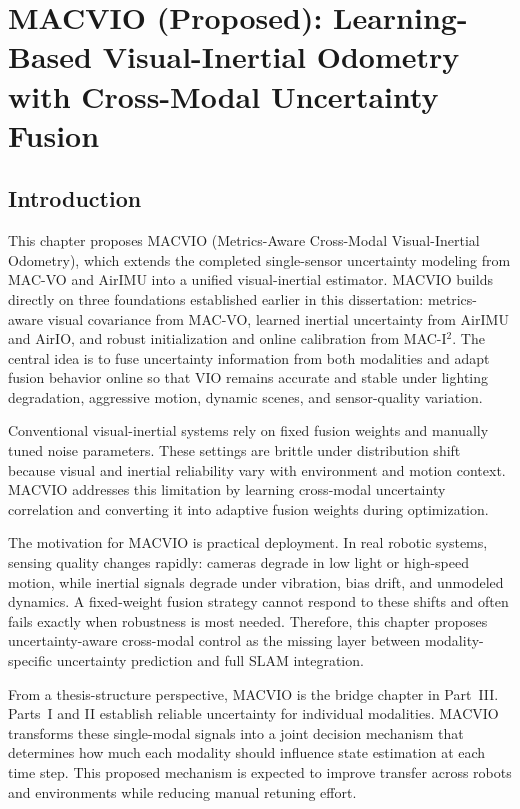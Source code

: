 \chapter{MACVIO (Proposed): Learning-Based Visual-Inertial Odometry with Cross-Modal Uncertainty Fusion} \label{chapter:macvio}

\section{Introduction}

This chapter proposes MACVIO (Metrics-Aware Cross-Modal Visual-Inertial Odometry), which extends the completed single-sensor uncertainty modeling from MAC-VO and AirIMU into a unified visual-inertial estimator.
MACVIO builds directly on three foundations established earlier in this dissertation: metrics-aware visual covariance from MAC-VO, learned inertial uncertainty from AirIMU and AirIO, and robust initialization and online calibration from MAC-I$^2$.
The central idea is to fuse uncertainty information from both modalities and adapt fusion behavior online so that VIO remains accurate and stable under lighting degradation, aggressive motion, dynamic scenes, and sensor-quality variation.

Conventional visual-inertial systems rely on fixed fusion weights and manually tuned noise parameters.
These settings are brittle under distribution shift because visual and inertial reliability vary with environment and motion context.
MACVIO addresses this limitation by learning cross-modal uncertainty correlation and converting it into adaptive fusion weights during optimization.

The motivation for MACVIO is practical deployment.
In real robotic systems, sensing quality changes rapidly: cameras degrade in low light or high-speed motion, while inertial signals degrade under vibration, bias drift, and unmodeled dynamics.
A fixed-weight fusion strategy cannot respond to these shifts and often fails exactly when robustness is most needed.
Therefore, this chapter proposes uncertainty-aware cross-modal control as the missing layer between modality-specific uncertainty prediction and full SLAM integration.

From a thesis-structure perspective, MACVIO is the bridge chapter in Part~III.
Parts~I and II establish reliable uncertainty for individual modalities.
MACVIO transforms these single-modal signals into a joint decision mechanism that determines how much each modality should influence state estimation at each time step.
This proposed mechanism is expected to improve transfer across robots and environments while reducing manual retuning effort.

